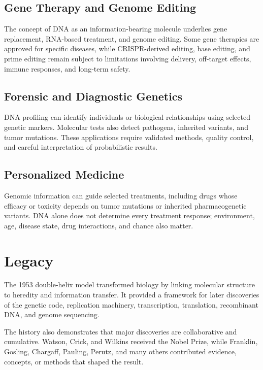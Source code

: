 \subsection{Gene Therapy and Genome Editing}

The concept of DNA as an information-bearing molecule underlies gene replacement, RNA-based treatment, and genome editing. Some gene therapies are approved for specific diseases, while CRISPR-derived editing, base editing, and prime editing remain subject to limitations involving delivery, off-target effects, immune responses, and long-term safety.

\subsection{Forensic and Diagnostic Genetics}

DNA profiling can identify individuals or biological relationships using selected genetic markers. Molecular tests also detect pathogens, inherited variants, and tumor mutations. These applications require validated methods, quality control, and careful interpretation of probabilistic results.

\subsection{Personalized Medicine}

Genomic information can guide selected treatments, including drugs whose efficacy or toxicity depends on tumor mutations or inherited pharmacogenetic variants. DNA alone does not determine every treatment response; environment, age, disease state, drug interactions, and chance also matter.

\section{Legacy}

The 1953 double-helix model transformed biology by linking molecular structure to heredity and information transfer. It provided a framework for later discoveries of the genetic code, replication machinery, transcription, translation, recombinant DNA, and genome sequencing.

The history also demonstrates that major discoveries are collaborative and cumulative. Watson, Crick, and Wilkins received the Nobel Prize, while Franklin, Gosling, Chargaff, Pauling, Perutz, and many others contributed evidence, concepts, or methods that shaped the result.

